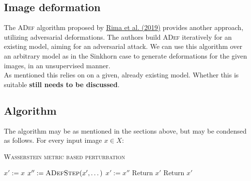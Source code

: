 \documentclass[]{article}
\begin{document}
\subsection{Image deformation}
The \textsc{ADef} algorithm proposed by \href{https://openreview.net/pdf?id=Hk4dFjR5K7}{Rima et al. (2019)} provides another approach, utilizing adversarial deformations. The authors build \textsc{ADef} iteratively for an existing model, aiming for an adversarial attack. We can use this algorithm over an arbitrary model as in the Sinkhorn case to generate deformations for the given images, in an unsupervised manner.  \\

As mentioned this relies on on a given, already existing model. Whether this is suitable \textbf{still needs to be discussed}.

\subsection{Algorithm}
The algorithm may be as mentioned in the sections above, but may be condensed as follows. For every input image $x\in X$:

\begin{algorithm}
	\caption{\textsc{Wasserstein metric based perturbation}}
	\begin{algorithmic}[1]
		
		\State $x':=x$ 
			\State $x'':=\textsc{ADefStep}(x',\dots)$
			\State $x':=x''$
				\State Return $x'$
			\EndIf
			\Else
			\State Return $x'$
			\EndIf
		\EndWhile
	
		\EndProcedure

	\end{algorithmic}
\end{algorithm}
\end{document}

